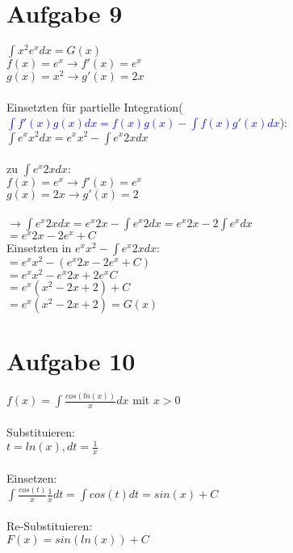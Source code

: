 \documentclass[12pt,a4paper]{article}
\begin{document}
\section*{Aufgabe 9}
$\int x^2e^xdx=G(x)$\\
$f(x) =e^x\rightarrow f'(x)=e^x$\\
$g(x) =x^2\rightarrow g'(x)=2x$\\
\\
Einsetzten für partielle Integration(\textcolor{blue}{$\int f'(x)g(x)dx=f(x)g(x)-\int f(x)g'(x)dx$}):\\
$\int e^xx^2dx=e^xx^2-\int e^x2x dx$\\
\\
zu $\int e^x2xdx$:\\
$f(x) =e^x\rightarrow f'(x)=e^x$\\
$g(x) =2x\rightarrow g'(x)=2$\\
\\
$\rightarrow \int e^x2x dx = e^x2x-\int e^x2dx = e^x2x-2\int e^x dx$\\
$=e^x2x-2e^x+C$\\
Einsetzten in $e^xx^2-\int e^x2x dx$:\\
$= e^xx^2-(e^x2x-2e^x+C)$\\$= e^xx^2-e^x2x+2e^xC$\\$= e^x(x^2-2x+2)+C$\\\underline{$=e^x(x^2-2x+2) = G(x)$}\\
\section*{Aufgabe 10}
$f(x)=\int \frac{cos(ln(x))}{x}dx$ mit $x>0$\\
\\
Substituieren:\\
$t=ln(x),dt=\frac{1}{x}$\\
\\
Einsetzen:\\
$\int \frac{cos(t)}{x}\frac{1}{x}dt=\int cos(t) dt=sin(x)+C$\\
\\
Re-Substituieren:\\
$F(x)=sin(ln(x))+C$
\end{document}
